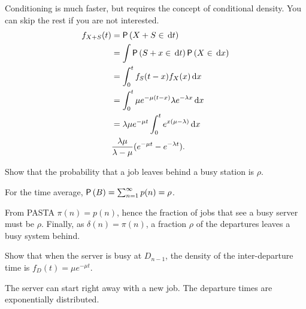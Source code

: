 \begin{exercise}
\begin{solution}
Conditioning is much faster, but requires the concept of conditional density. You can skip the rest if you are not interested. 
    \begin{align*}
    f_{X+S}(t) 
&= \P{X+S\in \d{t}} \\
&= \int \P{S+x\in \d{t}}\P{X\in \d{x}} \\
&=\int_0^t f_S(t-x) f_X(x) \d{x} \\
     &= \int_0^t \mu e^{-\mu(t-x)} \lambda e^{-\lambda x} \d{x} \\
     &= \lambda \mu e^{-\mu t} \int_0^t  e^{x(\mu-\lambda)} \d{x} \\
& \frac{\lambda \mu}{\lambda - \mu} (e^{-\mu t} - e^{-\lambda t}).
    \end{align*}
    \end{solution}
\end{exercise}

\begin{exercise}
Show that the probability that a job leaves behind a busy station is $\rho$.
    \begin{solution}
For the time average, 
        $\P B = \sum_{n=1}^\infty p(n) = \rho$.
    \end{solution}
From PASTA $\pi(n) = p(n)$, hence the fraction of jobs that see a busy server must be $\rho$. Finally, as $\delta(n) = \pi(n)$, a fraction $\rho$ of the departures leaves a busy system behind.
\end{exercise}

\begin{exercise}
Show  that when the server is busy at $D_{n-1}$, the density of the inter-departure time is $f_D(t) = \mu e^{-\mu t}$.
    \begin{solution}
The server can start right away with a new job. The departure times are exponentially distributed. 
    \end{solution}
\end{exercise}

